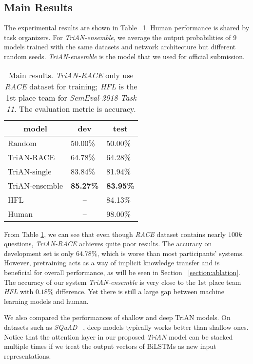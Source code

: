 \documentclass[11pt,a4paper]{article}
\begin{document}
\subsection{Main Results}

The experimental results are shown in Table ~\ref{table:main_results}.
Human performance is shared by task organizers.
For \emph{TriAN-ensemble},
we average the output probabilities of 9 models
trained with the same datasets and network architecture
but different random seeds.
\emph{TriAN-ensemble} is the model
that we used for official submission.

\begin{table}[ht]
\centering
\begin{tabular}{l|ll}
 \hline
\multicolumn{1}{c|}{model}     & \multicolumn{1}{c}{dev} & \multicolumn{1}{c}{test} \\ \hline
Random   & 50.00\%   & 50.00\%    \\ \hline
TriAN-RACE   & 64.78\%   & 64.28\%  \\ \hline
TriAN-single   & 83.84\%   & 81.94\%    \\ \hline
TriAN-ensemble & \textbf{85.27\%}   & \textbf{83.95\%}    \\ \hline \hline
HFL        & \multicolumn{1}{c}{--}   & 84.13\%    \\ \hline
Human         &  \multicolumn{1}{c}{--}    &  98.00\%  \\ \hline
\end{tabular}
\caption{Main results.
\emph{TriAN-RACE} only use \emph{RACE} dataset for training;
\emph{HFL} is the 1st place team for \emph{SemEval-2018 Task 11}.
The evaluation metric is accuracy.}
\label{table:main_results}
\end{table}

From Table \ref{table:main_results},
we can see that even though \emph{RACE} dataset contains nearly $100k$ questions,
\emph{TriAN-RACE} achieves quite poor results.
The accuracy on development set is only $64.78\%$,
which is worse than most participants' systems.
However,
pretraining acts as a way of implicit knowledge transfer
and is beneficial for overall performance,
as will be seen in Section ~\ref{section:ablation}.
The accuracy of our system \emph{TriAN-ensemble}
is very close to the 1st place team \emph{HFL} with $0.18\%$ difference.
Yet there is still a large gap between machine learning models and human.

We also compared the performances of shallow and deep TriAN models.
On datasets such as \emph{SQuAD} ~\cite{rajpurkar2016squad},
deep models typically works better than shallow ones.
Notice that the attention layer in our proposed \emph{TriAN} model
can be stacked multiple times
if we treat the output vectors of BiLSTMs as new input representations.
\end{document}
